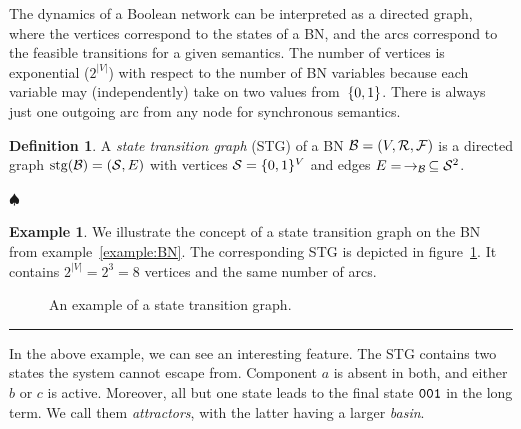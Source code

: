 \documentclass[
	digital, oneside, nosansbold, nocolorbold, nolot, nolof
]{fithesis4}
\theoremstyle{definition}
\newtheorem{definition}{Definition}
\theoremstyle{definition}
\newtheorem{example}{Example}
\newenvironment{ldefinition}
    {\begin{definition}}
	{\par\hspace{\stretch{1}}$\spadesuit$\hspace{\stretch{1}}
     \par\end{definition}}
\newenvironment{lexample}
    {\begin{example}}
    {\par\hspace{\stretch{1}}\rule{0.2\textwidth}{0.01ex}\hspace{\stretch{1}}
     \par\end{example}}
\DeclareMathOperator{\stg}{stg}
\DeclarePairedDelimiter{\set}{\{}{\}}
\begin{document}
The dynamics of a Boolean network can be interpreted as a directed graph, where
the vertices correspond to the states of a BN, and the arcs correspond to the
feasible transitions for a given semantics. The number of vertices is
exponential ($2^{|V|}$) with respect to the number of BN variables because each
variable may (independently) take on two values from~$\set{0, 1}$. There is
always just one outgoing arc from any node for synchronous semantics.

\begin{ldefinition}
A \emph{state transition graph} (STG) of a BN $\mathcal{B} = (V, \mathcal{R},
\mathcal{F})$ is a directed graph $\stg(\BN{B}) = (\mathcal{S}, E)$ with
vertices $\mathcal{S} = \set{0, 1}^V$ and edges $E =\,
\to_{\mathcal{B}} \, \subseteq \mathcal{S}^2$.
\end{ldefinition}

\begin{lexample}
We illustrate the concept of a state transition graph on the BN from
example~\ref{example:BN}. The corresponding STG is depicted in
figure~\ref{fig:STG}. It contains $2^{|V|} = 2^3 = 8$ vertices and the same
number of arcs.
\begin{figure}[!ht]
\centering
{}
\caption[An example of a STG]{An example of a state transition graph.}
\label{fig:STG}
\end{figure}
\end{lexample}

In the above example, we can see an interesting feature. The STG contains two
states the system cannot escape from. Component $a$ is absent in both, and
either $b$ or $c$ is active. Moreover, all but one state leads to the final
state $\mathtt{001}$ in the long term. We call them \emph{attractors}, with the
latter having a larger \emph{basin}.
\end{document}

